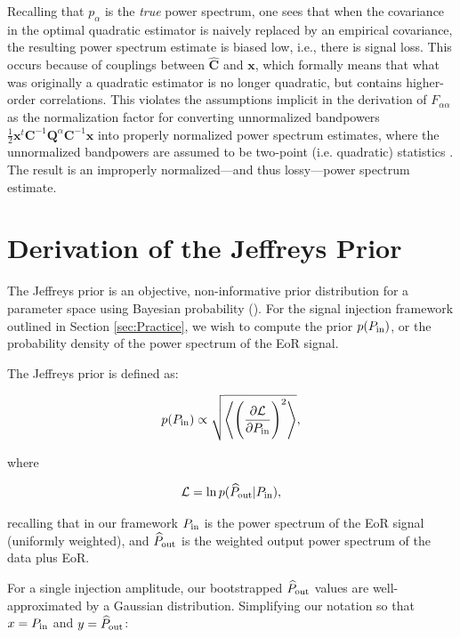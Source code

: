 \documentclass[preprint2,numberedappendix,tighten]{aastex6}  %
\newcommand{\x}{\mathbf{x}}
\newcommand{\C}{\mathbf{C}}
\newcommand{\Q}{\mathbf{Q}}
\begin{document}
Recalling that $p_\alpha$ is the \emph{true} power spectrum, one sees that when the covariance in the optimal quadratic estimator is naively replaced by an empirical covariance, the resulting power spectrum estimate is biased low, i.e., there is signal loss. This occurs because of couplings between $\widehat{\C}$ and $\x$, which formally means that what was originally a quadratic estimator is no longer quadratic, but contains higher-order correlations. This violates the assumptions implicit in the derivation of $F_{\alpha \alpha}$ as the normalization factor for converting unnormalized bandpowers $\frac{1}{2} \x^t \C^{-1} \Q^{\alpha} \C^{-1} \x$ into properly normalized power spectrum estimates, where the unnormalized bandpowers are assumed to be two-point (i.e. quadratic) statistics \citep{liu_tegmark2011}. The result is an improperly normalized---and thus lossy---power spectrum estimate.

\section{Derivation of the Jeffreys Prior}
\label{sec:jeffreys}

The Jeffreys prior is an objective, non-informative prior distribution for a parameter space using Bayesian probability (\citealt{jaynes1968}). For the signal injection framework outlined in Section \ref{sec:Practice}, we wish to compute the prior $p(P_{\rm in})$, or the probability density of the power spectrum of the EoR signal. 

The Jeffreys prior is defined as: 

\begin{equation}
\label{eq:jeffreys}
p(P_{\rm in}) \propto \sqrt {\Bigg\langle \Bigg(\frac{\partial \mathcal{L}}{\partial P_{\rm in}} \Bigg)^{2}\Bigg\rangle},
\end{equation}

\noindent where

\begin{equation}
\label{eq:logprob}
\mathcal{L} = \mathrm{ln} \, p(\widehat{P}_{\rm out} | P_{\rm in}),
\end{equation}

\noindent recalling that in our framework $P_{\rm in}$ is the power spectrum of the EoR signal (uniformly weighted), and $\widehat{P}_{\rm out}$ is the weighted output power spectrum of the data plus EoR.

For a single injection amplitude, our bootstrapped $\widehat{P}_{\rm out}$ values are well-approximated by a Gaussian distribution. Simplifying our notation so that $x = P_{\rm in}$ and $y = \widehat{P}_{\rm out}$:
\end{document}
